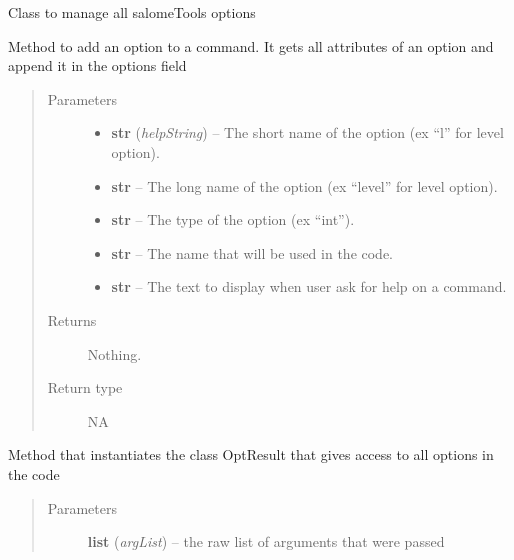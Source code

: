 \documentclass[a4paper,10pt,english]{sphinxmanual}
\begin{document}
\begin{fulllineitems}
\label{commands/apidoc/src:src.options.Options}
Class to manage all salomeTools options

\begin{fulllineitems}
\label{commands/apidoc/src:src.options.Options.add_option}
Method to add an option to a command. It gets all attributes
of an option and append it in the options field
\begin{quote}\begin{description}
\item[{Parameters}] \leavevmode\begin{itemize}
\item {} 
\textbf{str} (\emph{helpString}) -- The short name of the option
(ex ``l'' for level option).

\item {} 
\textbf{str} -- The long name of the option 
(ex ``level'' for level option).

\item {} 
\textbf{str} -- The type of the option (ex ``int'').

\item {} 
\textbf{str} -- The name that will be used in the code.

\item {} 
\textbf{str} -- The text to display 
when user ask for help on a command.

\end{itemize}

\item[{Returns}] \leavevmode
Nothing.

\item[{Return type}] \leavevmode
NA

\end{description}\end{quote}

\end{fulllineitems}


\begin{fulllineitems}
\label{commands/apidoc/src:src.options.Options.parse_args}
Method that instantiates the class OptResult 
that gives access to all options in the code
\begin{quote}\begin{description}
\item[{Parameters}] \leavevmode
\textbf{list} (\emph{argList}) -- the raw list of arguments that were passed


\end{description}
\end{quote}
\end{fulllineitems}
\end{fulllineitems}
\end{document}
